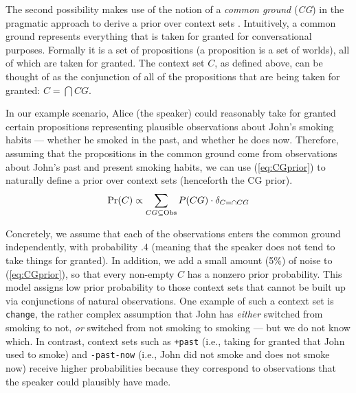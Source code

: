 
The second possibility makes use of the notion of a \emph{common ground} (\emph{CG}) 
 in the pragmatic approach to derive a prior over context sets
 \cite{Stalnaker1974:Pragmatic-Presuppositions}.
Intuitively, a common ground represents everything that is taken for granted for conversational purposes.
Formally it is a set of propositions (a proposition is a set of
  worlds), all of which are taken for granted. The context set $C$, as defined above, can be thought of as the conjunction of all of the propositions that are being taken for granted: $C = \bigcap \mathit{CG}$.
  
In our example scenario, Alice (the speaker) could reasonably take for granted certain propositions representing plausible observations about John's smoking habits --- whether he smoked in the past, and whether he does now.
Therefore, assuming that the propositions in the common ground come from 
 observations about John's past and present smoking habits, 
 we can use (\ref{eq:CGprior}) to naturally define a prior over context sets (henceforth the CG prior).
\vspace{-1ex}
\begin{equation}
\vspace{-1ex}
\Pr(C) \propto \sum_{CG\subseteq\text{Obs}} P(CG) \cdot \delta_{C=\cap CG}
\label{eq:CGprior}
\end{equation}
  
Concretely, we assume that each of the observations enters the common ground
 independently, with probability $.4$ (meaning that the speaker does not tend to 
 take things for granted).
In addition, we add a small amount (5\%) of noise to (\ref{eq:CGprior}), so that every non-empty $C$ has a nonzero prior probability. This model assigns low prior probability to those context sets that cannot be built up via conjunctions of natural observations. One example of such a context set is \verb=change=, the rather complex assumption that John has \emph{either} switched from smoking to not, \emph{or} switched from not smoking to smoking --- but we do not know which. In contrast, context sets such as \verb|+past| (i.e., taking for granted that John used to smoke) and \verb|-past-now| (i.e., John did not smoke and does not smoke now) receive higher probabilities because they correspond to observations that the speaker could plausibly have made.  

